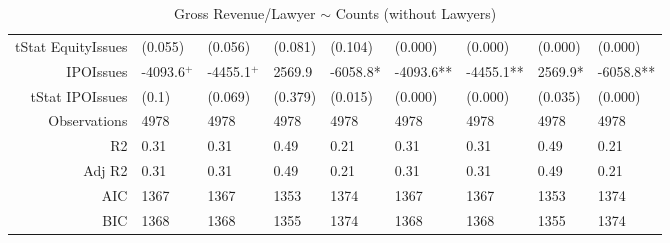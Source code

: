 \begin{table}[ht]
\begin{tabular}{rllllllll}
  tStat EquityIssues & (0.055) & (0.056) & (0.081) & (0.104) & (0.000) & (0.000) & (0.000) & (0.000) \\ 
  IPOIssues & -4093.6$^{+}$ & -4455.1$^{+}$ & 2569.9 & -6058.8* & -4093.6** & -4455.1** & 2569.9* & -6058.8** \\ 
  tStat IPOIssues & (0.1) & (0.069) & (0.379) & (0.015) & (0.000) & (0.000) & (0.035) & (0.000) \\ 
  Observations & 4978 & 4978 & 4978 & 4978 & 4978 & 4978 & 4978 & 4978 \\ 
  R2 & 0.31 & 0.31 & 0.49 & 0.21 & 0.31 & 0.31 & 0.49 & 0.21 \\ 
  Adj R2 & 0.31 & 0.31 & 0.49 & 0.21 & 0.31 & 0.31 & 0.49 & 0.21 \\ 
  AIC & 1367 & 1367 & 1353 & 1374 & 1367 & 1367 & 1353 & 1374 \\ 
  BIC & 1368 & 1368 & 1355 & 1374 & 1368 & 1368 & 1355 & 1374 \\ 
   \hline
\end{tabular}
\caption{Gross Revenue/Lawyer $\sim$ Counts (without Lawyers)} 
\end{table}
